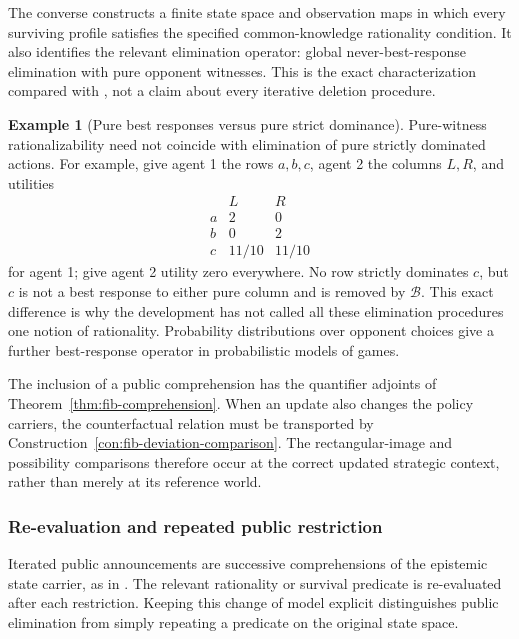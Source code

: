 \documentclass[11pt,a4paper]{article}
\numberwithin{equation}{section}
\theoremstyle{definition}
\newtheorem{example}[theorem]{Example}
\theoremstyle{remark}
\theoremstyle{plain}
\begin{document}
The converse constructs a finite state space and observation maps
in which every surviving profile satisfies the specified common-knowledge
rationality condition. It also identifies the relevant elimination
operator: global never-best-response elimination with pure opponent
witnesses. This is the exact characterization compared with
\citet{ZvesperApt2010}, not a claim about every iterative deletion
procedure.

\begin{example}[Pure best responses versus pure strict dominance]
Pure-witness rationalizability need not coincide with elimination
of pure strictly dominated actions. For example, give agent 1
the rows $a,b,c$, agent 2 the columns $L,R$, and utilities
\[
\begin{array}{c|cc}
 & L&R\\\hline
a&2&0\\
b&0&2\\
c&11/10&11/10
\end{array}
\]
for agent 1; give agent 2 utility zero everywhere. No row strictly
dominates $c$, but $c$ is not a best response to either pure column
and is removed by $\mathcal B$. This exact difference is why the
development has not called all these elimination procedures one notion
of rationality. Probability distributions over opponent choices give a further
best-response operator in probabilistic models of games.
\end{example}

The inclusion of a public comprehension has the quantifier
adjoints of Theorem~\ref{thm:fib-comprehension}. When an update also
changes the policy carriers, the counterfactual relation must be
transported by Construction~\ref{con:fib-deviation-comparison}.
The rectangular-image and possibility comparisons therefore occur at
the correct updated strategic context, rather than merely at its
reference world.

\subsubsection{Re-evaluation and repeated public restriction}
\label{sec:egt-announcement-iteration}

Iterated public announcements are successive comprehensions of
the epistemic state carrier, as in
\citet{Plaza2007PublicCommunications}. The relevant rationality or
survival predicate is re-evaluated after each restriction. Keeping this
change of model explicit distinguishes public elimination from simply
repeating a predicate on the original state space.
\end{document}
